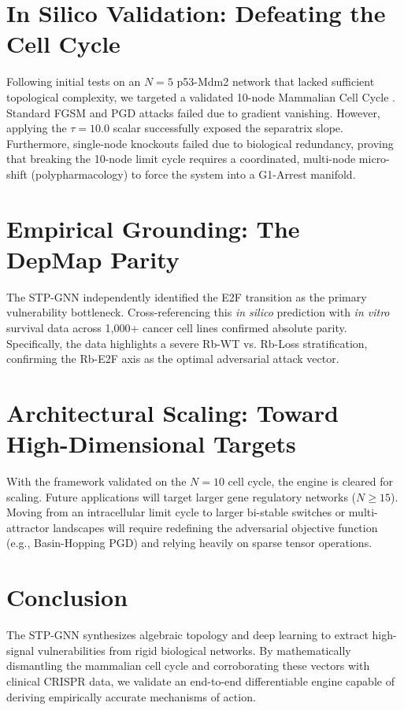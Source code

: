 \documentclass[11pt, letterpaper]{article}
\begin{document}
	\section{In Silico Validation: Defeating the Cell Cycle}
	Following initial tests on an $N=5$ p53-Mdm2 network that lacked sufficient topological complexity, we targeted a validated 10-node Mammalian Cell Cycle \cite{faure2006}. Standard FGSM and PGD attacks failed due to gradient vanishing. However, applying the $\tau = 10.0$ scalar successfully exposed the separatrix slope. Furthermore, single-node knockouts failed due to biological redundancy, proving that breaking the 10-node limit cycle requires a coordinated, multi-node micro-shift (polypharmacology) to force the system into a G1-Arrest manifold.
	
	\section{Empirical Grounding: The DepMap Parity}
	The STP-GNN independently identified the E2F transition as the primary vulnerability bottleneck. Cross-referencing this \textit{in silico} prediction with \textit{in vitro} survival data across 1,000+ cancer cell lines \cite{depmap2025} confirmed absolute parity. Specifically, the data highlights a severe Rb-WT vs. Rb-Loss stratification, confirming the Rb-E2F axis as the optimal adversarial attack vector.
	
	\section{Architectural Scaling: Toward High-Dimensional Targets}
	With the framework validated on the $N=10$ cell cycle, the engine is cleared for scaling. Future applications will target larger gene regulatory networks ($N \ge 15$). Moving from an intracellular limit cycle to larger bi-stable switches or multi-attractor landscapes will require redefining the adversarial objective function (e.g., Basin-Hopping PGD) and relying heavily on sparse tensor operations.
	
	\section{Conclusion}
	The STP-GNN synthesizes algebraic topology and deep learning to extract high-signal vulnerabilities from rigid biological networks. By mathematically dismantling the mammalian cell cycle and corroborating these vectors with clinical CRISPR data, we validate an end-to-end differentiable engine capable of deriving empirically accurate mechanisms of action.
	
\end{document}
